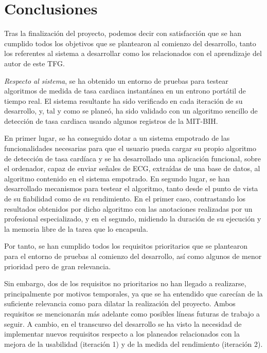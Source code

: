 

\section{Conclusiones}

Tras la finalización del proyecto, podemos decir con satisfacción que se han cumplido todos los objetivos que se plantearon al comienzo del desarrollo, tanto los referentes al sistema a desarrollar como los relacionados con el aprendizaje del autor de este TFG.

\textit{Respecto al  sistema}, se ha obtenido un entorno de pruebas para testear algoritmos de medida de tasa cardiaca instantánea en un entrono portátil de tiempo real. El sistema resultante ha sido verificado en cada iteración de su desarrollo, y, tal y como se planeó, ha sido validado con un algoritmo sencillo de detección de tasa cardiaca usando algunos registros de la MIT-BIH.

En primer lugar, se ha conseguido dotar a un sistema empotrado de las funcionalidades necesarias para que el usuario pueda cargar su propio algoritmo de detección de tasa cardíaca y se ha desarrollado una aplicación funcional, sobre el ordenador, capaz de enviar señales de ECG, extraídas de una base de datos, al algoritmo contenido en el sistema empotrado. En segundo lugar, se han desarrollado  mecanismos para testear el algoritmo, tanto desde el punto de vista de su fiabilidad como de su rendimiento. En el primer caso, contrastando los resultados obtenidos por dicho algoritmo con las anotaciones realizadas por un profesional especializado, y en el segundo, midiendo la duración de su ejecución y la memoria libre de la tarea que lo encapsula. 

Por tanto, se han cumplido todos los requisitos prioritarios que se plantearon para el entorno de pruebas al comienzo del desarrollo, así como algunos de menor prioridad pero de gran relevancia. 

Sin embargo, dos de los requisitos no prioritarios no han llegado a realizarse, principalmente por motivos temporales, ya que se ha entendido que carecían de la suficiente relevancia como para dilatar la realización del proyecto. Ambos requisitos se mencionarán más adelante como posibles líneas futuras de trabajo a seguir. A cambio, en el transcurso del desarrollo se ha visto la necesidad de implementar nuevos requisitos respecto a los planeados relacionados con la mejora de la usabilidad (iteración 1) y de la medida del rendimiento (iteración 2). 

